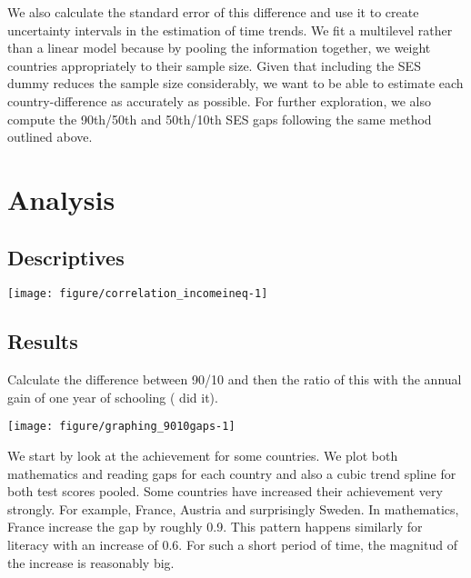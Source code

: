 \documentclass[11pt, a4paper]{article}\usepackage[]{graphicx}\usepackage[]{color}
\begin{document}
We also calculate the standard error of this difference and use it to create uncertainty intervals in the estimation of time trends. We fit a multilevel rather than a linear model because by pooling the information together, we weight countries appropriately to their sample size. Given that including the SES dummy reduces the sample size considerably, we want to be able to estimate each country-difference as accurately as possible. For further exploration, we also compute the 90th/50th and 50th/10th SES gaps following the same method outlined above.

\section{Analysis}

\subsection{Descriptives}










{\centering \texttt{[image: figure/correlation\_incomeineq-1]} 

}




\subsection{Results}

Calculate the difference between 90/10 and then the ratio of this with the annual gain of one year of schooling (\citet{micklewright} did it).



{\centering \texttt{[image: figure/graphing\_9010gaps-1]} 

}




We start by look at the achievement for some countries. We plot both mathematics and reading gaps for each country and also a cubic trend spline for both test scores pooled. Some countries have increased their achievement very strongly. For example, France, Austria and surprisingly Sweden. In mathematics, France increase the gap by roughly 0.9. This pattern happens similarly for literacy with an increase of 0.6. For such a short period of time, the magnitud of the increase is reasonably big.
\end{document}
